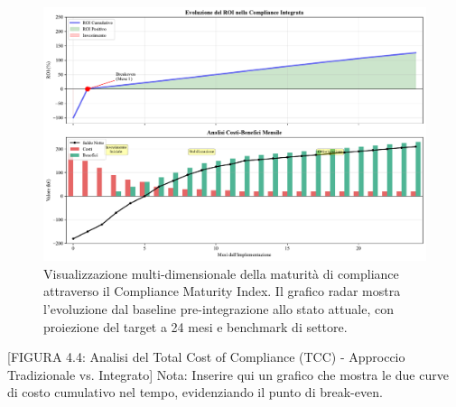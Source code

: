 \begin{refsection}
\begin{figure}[htbp]
\centering
\includegraphics[width=1\textwidth]{thesis_figures/cap4/figura_4_supplementare_roi_timeline.pdf}
\caption{Visualizzazione multi-dimensionale della maturità di compliance attraverso il Compliance Maturity Index. Il grafico radar mostra l'evoluzione dal baseline pre-integrazione allo stato attuale, con proiezione del target a 24 mesi e benchmark di settore.}
\label{fig:supplementare_roi_timeline}
\end{figure}

[FIGURA 4.4: Analisi del Total Cost of Compliance (TCC) - Approccio Tradizionale vs. Integrato]
Nota: Inserire qui un grafico che mostra le due curve di costo cumulativo nel tempo, evidenziando il punto di break-even.



\end{refsection}
